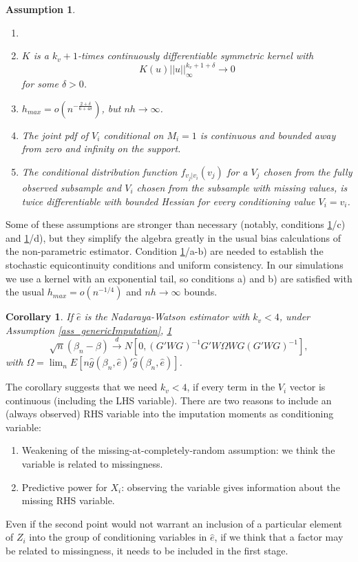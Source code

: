 \documentclass{article}
\newtheorem{assumption}{Assumption}
\newtheorem{corollary}{Corollary}
\theoremstyle{definition}
\theoremstyle{remark}
\begin{document}
\begin{assumption}\label{ass_kernelEstimation}
    \begin{enumerate}
    	\item[]
        \item[a)] $K$ is a $k_v+1$-times continuously differentiable symmetric kernel with
        \[K(u)||u||_\infty^{k_v+1+\delta}\rightarrow 0 \]
        for some $\delta>0$.
        \item[b)] $h_{max}=o\left(n^{-\frac{2+\delta}{6+4\delta}} \right)$, but $nh\rightarrow \infty$. 
        \item[c)] The joint pdf of $V_i$ conditional on $M_i=1$ is continuous and bounded away from zero and infinity on the support.
        \item[d)] The conditional distribution function $f_{v_j|v_i}(v_j)$ for a $V_j$ chosen from the fully observed subsample and $V_i$ chosen from the subsample with missing values, is twice differentiable with bounded Hessian for every conditioning value $V_i=v_i$.
    \end{enumerate}
\end{assumption}
Some of these assumptions are stronger than necessary (notably, conditions \ref{ass_kernelEstimation}/c) and \ref{ass_kernelEstimation}/d), but they simplify the algebra greatly in the usual bias calculations of the non-parametric estimator. Condition \ref{ass_kernelEstimation}/a-b) are needed to establish the stochastic equicontinuity conditions and uniform consistency. In our simulations we use a kernel with an exponential tail, so conditions a) and b) are satisfied with the usual $h_{max} = o(n^{-1/4})$ and $nh \rightarrow \infty$ bounds. 
\begin{corollary}\label{cor_NWTheory}
	If $\hat{e}$ is the Nadaraya-Watson estimator with $k_v<4$, under Assumption \ref{ass_genericImputation}, \ref{ass_kernelEstimation}
		\[\sqrt{n}(\beta_n-\beta) \stackrel{d}{\rightarrow} N[0, (G'WG)^{-1}G'W \Omega W G (G'WG)^{-1}],
		\]
	with $\Omega= \lim_n E[n\hat{g}(\beta_n, \hat{e})'\hat{g}(\beta_n, \hat{e})]$. 
\end{corollary}
The corollary suggests that we need $k_v<4$, if every term in the $V_i$ vector is continuous (including the LHS variable). There are two reasons to include an (always observed) RHS variable into the imputation moments as conditioning variable:
\begin{enumerate}
	\item Weakening of the missing-at-completely-random assumption: we think the variable is related to missingness.
	\item Predictive power for $X_i$: observing the variable gives information about the missing RHS variable.
\end{enumerate}
Even if the second point would not warrant an inclusion of a particular element of $Z_i$ into the group of conditioning variables in $\hat{e}$, if we think that a factor may be related to missingness, it needs to be included in the first stage.
\end{document}
